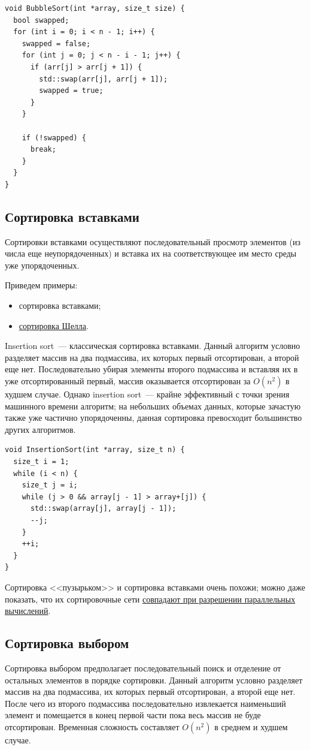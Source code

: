 \begin{verbatim}
void BubbleSort(int *array, size_t size) {
  bool swapped;
  for (int i = 0; i < n - 1; i++) {
    swapped = false;
    for (int j = 0; j < n - i - 1; j++) {
      if (arr[j] > arr[j + 1]) {
        std::swap(arr[j], arr[j + 1]);
        swapped = true;
      }
    }
    
    if (!swapped) {
      break;
    }
  }
}
\end{verbatim}

\subsection{Сортировка вставками}

Сортировки вставками осуществляют последовательный просмотр элементов (из числа еще неупорядоченных) и вставка их на соответствующее
им место среды уже упорядоченных.

Приведем примеры:
\begin{itemize}
  \item сортировка вставками;
  \item \href{https://en.wikipedia.org/wiki/Shellsort}{сортировка Шелла}.
\end{itemize}

Insertion sort~--- классическая сортировка вставками. Данный алгоритм условно разделяет массив на два подмассива, их которых первый отсортирован,
а второй еще нет. Последовательно убирая элементы второго подмассива и вставляя их в уже отсортированный первый, массив оказывается
отсортирован за \(O(n^2)\) в худшем случае. Однако insertion sort~--- крайне эффективный с точки зрения машинного времени алгоритм; на небольших
объемах данных, которые зачастую также уже частично упорядоченны, данная сортировка превосходит большинство других алгоритмов.

\begin{verbatim}
void InsertionSort(int *array, size_t n) {
  size_t i = 1;
  while (i < n) {
    size_t j = i;
    while (j > 0 && array[j - 1] > array+[j]) {
      std::swap(array[j], array[j - 1]);
      --j;
    }
    ++i;
  }
}
\end{verbatim}

Сортировка <<пузырьком>> и сортировка вставками очень похожи; можно даже показать, что их сортировочные
сети \href{https://ru.wikipedia.org/wiki/Сеть_сортировки}{совпадают при разрешении параллельных вычислений}.

\subsection{Сортировка выбором}
Сортировка выбором предполагает последовательный поиск и отделение от остальных элементов в порядке сортировки.
Данный алгоритм условно разделяет массив на два подмассива, их которых первый отсортирован,
а второй еще нет. После чего из второго подмассива последовательно извлекается наименьший элемент и помещается в конец первой части
пока весь массив не буде отсортирован. Временная сложность составляет \(O(n^2)\) в среднем и худшем случае.


